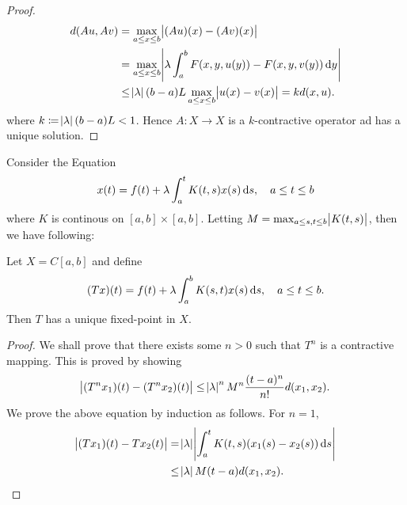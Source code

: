 \begin{example}
\begin{proof}
\begin{equation*}
    \begin{aligned}
        d(Au, Av) &= \max_{a \le x \le b} \abs{(Au)(x) - (Av)(x)} \\
        &= \max_{a \le x \le b} 
        \abs{ \lambda \int_{a}^{b} F(x, y, u(y)) - F(x, y, v(y)) \mathop{}\!\mathrm{d} y}\\
        &\le \abs{\lambda} (b - a)L \max_{a \le x \le b} \abs{u(x) - v(x)} 
        = k d(x, u). 
    \end{aligned}
\end{equation*}
where $k \coloneqq \abs{\lambda} (b - a) L < 1$. 
Hence $A: X \to X$ is a $k$-contractive operator ad has a unique solution. 
\end{proof}
\end{example}

\begin{example}
Consider the Equation 
\begin{equation}
    x(t) = f(t) + \lambda \int_{a}^{t} K(t, s) x(s) \mathop{}\!\mathrm{d} s, \quad 
    a \le t \le b
\end{equation}
where $K$ is continous on $[a, b] \times [a, b]$. 
Letting $M = \max_{a \le s, t \le b} \abs{K(t, s)}$, then we have following: 
\begin{thm}
Let $X = C[a, b]$ and define 
\begin{equation}
    (Tx)(t) = f(t) + \lambda \int_{a}^{b} K(s, t) x(s) \mathop{}\!\mathrm{d} s, \quad 
    a \le t \le b.
\end{equation} 
Then $T$ has a unique fixed-point in $X$. 
\end{thm}
\begin{proof}
We shall prove that there exists some $n > 0$ such that $T^n$ is a 
contractive mapping. 
This is proved by showing 
\begin{equation}
    \label{equ:metric_spaces:fixed_point_theorem:volterra:target}
    \abs{(T^nx_1)(t) - (T^n x_2)(t)} \le \abs{\lambda}^n M^n 
    \frac{(t - a)^n}{n!}d(x_1, x_2). 
\end{equation}
We prove the above equation by induction as follows. 
For $n = 1$, 
\begin{equation*}
    \begin{aligned}
        \abs{(Tx_1)(t) - Tx_2(t)} &= \abs{\lambda} 
            \abs{\int_{a}^{t} K(t, s) (x_1(s) - x_2(s)) \mathop{}\!\mathrm{d} s} \\
        &\le \abs{\lambda} M (t - a) d(x_1, x_2). 
    \end{aligned}
\end{equation*}

\end{proof}
\end{example}
